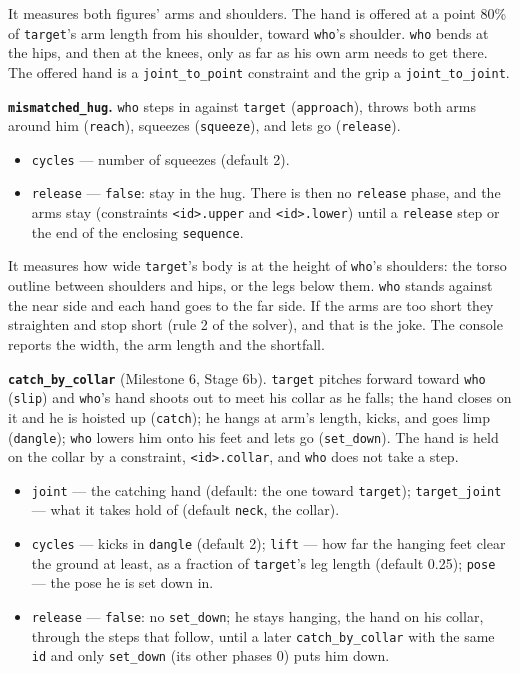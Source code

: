 \documentclass[
  12pt,
  letterpaper,
]{book}
\providecommand{\tightlist}{%
  \setlength{\itemsep}{0pt}\setlength{\parskip}{0pt}}
\begin{document}
It measures both figures' arms and shoulders. The hand is offered at a
point 80\% of \texttt{target}'s arm length from his shoulder, toward
\texttt{who}'s shoulder. \texttt{who} bends at the hips, and then at
the knees, only as far as his own arm needs to get there. The offered
hand is a \texttt{joint\_to\_point} constraint and the grip a
\texttt{joint\_to\_joint}.

\textbf{\texttt{mismatched\_hug}.} \texttt{who} steps in against
\texttt{target} (\texttt{approach}), throws both arms around him
(\texttt{reach}), squeezes (\texttt{squeeze}), and lets go
(\texttt{release}).

\begin{itemize}
\tightlist
\item
  \texttt{cycles} --- number of squeezes (default 2).
\item
  \texttt{release} --- \texttt{false}: stay in the hug. There is then
  no \texttt{release} phase, and the arms stay (constraints
  \texttt{<id>.upper} and \texttt{<id>.lower}) until a \texttt{release}
  step or the end of the enclosing \texttt{sequence}.
\end{itemize}

It measures how wide \texttt{target}'s body is at the height of
\texttt{who}'s shoulders: the torso outline between shoulders and hips,
or the legs below them. \texttt{who} stands against the near side and
each hand goes to the far side. If the arms are too short they
straighten and stop short (rule 2 of the solver), and that is the joke.
The console reports the width, the arm length and the shortfall.

\textbf{\texttt{catch\_by\_collar}} (Milestone 6, Stage 6b).
\texttt{target} pitches forward toward \texttt{who} (\texttt{slip}) and
\texttt{who}'s hand shoots out to meet his collar as he falls; the hand
closes on it and he is hoisted up (\texttt{catch}); he hangs at arm's
length, kicks, and goes limp (\texttt{dangle}); \texttt{who} lowers him
onto his feet and lets go (\texttt{set\_down}). The hand is held on the
collar by a constraint, \texttt{<id>.collar}, and \texttt{who} does not
take a step.

\begin{itemize}
\tightlist
\item
  \texttt{joint} --- the catching hand (default: the one toward
  \texttt{target}); \texttt{target\_joint} --- what it takes hold of
  (default \texttt{neck}, the collar).
\item
  \texttt{cycles} --- kicks in \texttt{dangle} (default 2);
  \texttt{lift} --- how far the hanging feet clear the ground at least,
  as a fraction of \texttt{target}'s leg length (default 0.25);
  \texttt{pose} --- the pose he is set down in.
\item
  \texttt{release} --- \texttt{false}: no \texttt{set\_down}; he stays
  hanging, the hand on his collar, through the steps that follow, until
  a later \texttt{catch\_by\_collar} with the same \texttt{id} and only
  \texttt{set\_down} (its other phases 0) puts him down.
\end{itemize}
\end{document}
